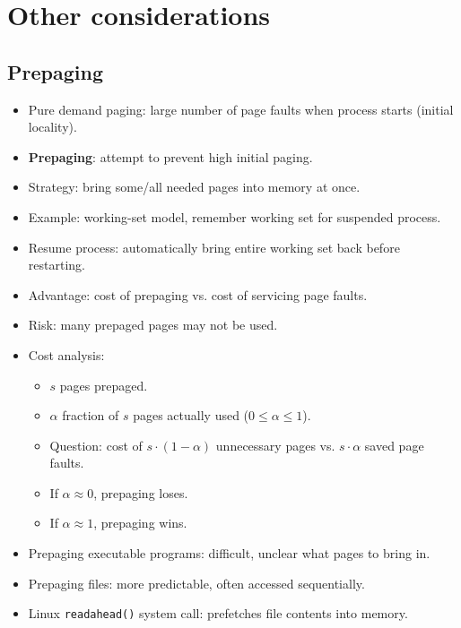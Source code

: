 \section{Other considerations}

\subsection{Prepaging}
\begin{itemize}
    \item Pure demand paging: large number of page faults when process starts (initial locality).
    \item \textbf{Prepaging}: attempt to prevent high initial paging.
    \item Strategy: bring some/all needed pages into memory at once.
    \item Example: working-set model, remember working set for suspended process.
    \item Resume process: automatically bring entire working set back before restarting.
    \item Advantage: cost of prepaging vs. cost of servicing page faults.
    \item Risk: many prepaged pages may not be used.
    \item Cost analysis:
    \begin{itemize}
        \item $s$ pages prepaged.
        \item $\alpha$ fraction of $s$ pages actually used ($0 \le \alpha \le 1$).
        \item Question: cost of $s \cdot (1 - \alpha)$ unnecessary pages vs. $s \cdot \alpha$ saved page faults.
        \item If $\alpha \approx 0$, prepaging loses.
        \item If $\alpha \approx 1$, prepaging wins.
    \end{itemize}
    \item Prepaging executable programs: difficult, unclear what pages to bring in.
    \item Prepaging files: more predictable, often accessed sequentially.
    \item Linux \texttt{readahead()} system call: prefetches file contents into memory.
\end{itemize}

